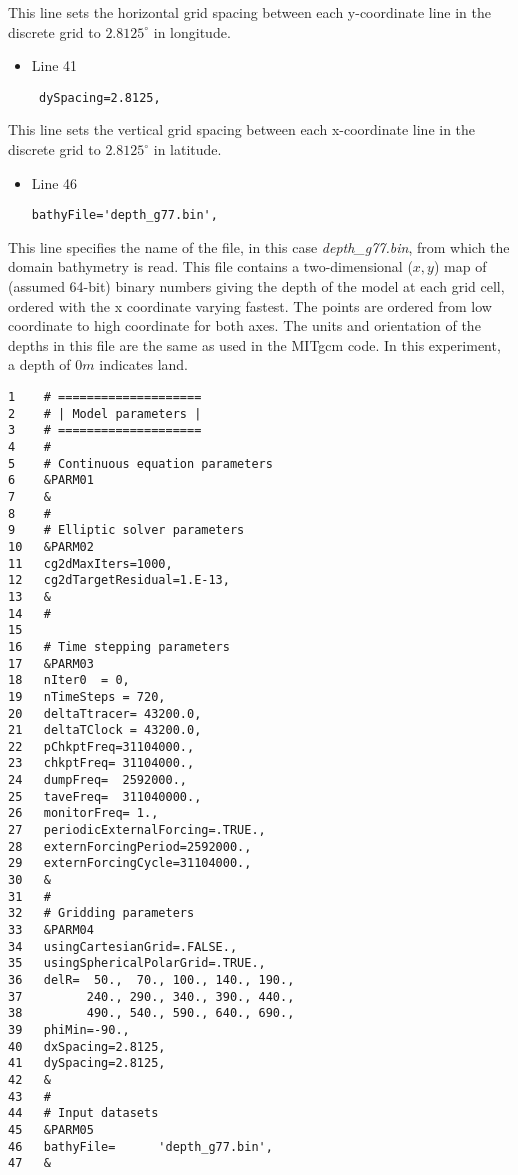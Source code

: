 \noindent This line sets the horizontal grid spacing between each
y-coordinate line in the discrete grid to $2.8125^{\circ}$ in
longitude.

\begin{itemize}
\item Line 41
\begin {verbatim}
 dySpacing=2.8125,
\end{verbatim}
\end{itemize}

\noindent This line sets the vertical grid spacing between each
x-coordinate line in the discrete grid to $2.8125^{\circ}$ in
latitude.

\begin{itemize}
\item Line 46
\begin {verbatim}
bathyFile='depth_g77.bin',
\end{verbatim}
\end{itemize}

\noindent This line specifies the name of the file, in this case {\it
  depth\_g77.bin}, from which the domain bathymetry is read. This file
contains a two-dimensional ($x,y$) map of (assumed 64-bit) binary
numbers giving the depth of the model at each grid cell, ordered with
the x coordinate varying fastest. The points are ordered from low
coordinate to high coordinate for both axes. The units and orientation
of the depths in this file are the same as used in the MITgcm code. In
this experiment, a depth of $0m$ indicates land.
  

\begin {verbatim}
1    # ====================
2    # | Model parameters |
3    # ====================
4    #
5    # Continuous equation parameters
6    &PARM01
7    &
8    #
9    # Elliptic solver parameters
10   &PARM02
11   cg2dMaxIters=1000,
12   cg2dTargetResidual=1.E-13,
13   &
14   #
15
16   # Time stepping parameters
17   &PARM03
18   nIter0  = 0,
19   nTimeSteps = 720,
20   deltaTtracer= 43200.0,
21   deltaTClock = 43200.0,
22   pChkptFreq=31104000.,
23   chkptFreq= 31104000.,
24   dumpFreq=  2592000.,
25   taveFreq=  311040000.,
26   monitorFreq= 1.,
27   periodicExternalForcing=.TRUE.,
28   externForcingPeriod=2592000.,
29   externForcingCycle=31104000.,
30   &
31   #
32   # Gridding parameters
33   &PARM04
34   usingCartesianGrid=.FALSE.,
35   usingSphericalPolarGrid=.TRUE.,
36   delR=  50.,  70., 100., 140., 190., 
37         240., 290., 340., 390., 440., 
38         490., 540., 590., 640., 690.,
39   phiMin=-90.,
40   dxSpacing=2.8125,
41   dySpacing=2.8125,
42   &
43   #
44   # Input datasets
45   &PARM05
46   bathyFile=      'depth_g77.bin',
47   &
\end{verbatim}

